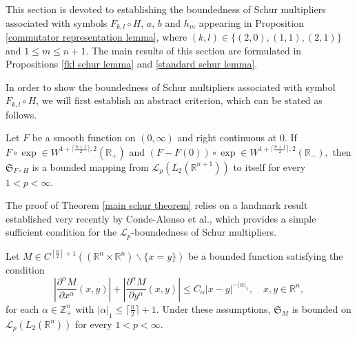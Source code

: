 \documentclass[12pt]{amsart}
\begin{document}
This section is devoted to establishing the boundedness of Schur multipliers associated with symbols $F_{k,l}\circ H$, $a$, $b$ and $h_m$ appearing in Proposition \ref{commutator representation lemma},  where $(k,l)\in\{(2,0),(1,1),(2,1)\}$ and $1\leq m\leq n+1$. The main results of this section are formulated in Propositions \ref{fkl schur lemma} and \ref{standard schur lemma}.


In order to show the boundedness of Schur multipliers associated with symbol $F_{k,l}\circ H$, we will first establish an abstract criterion, which can be stated as follows.
\begin{theorem}\label{main schur theorem} Let $F$ be a smooth function on $(0,\infty)$ and right continuous at $0.$ If $F\circ\exp\in W^{1+\lceil\frac{n+1}{2}\rceil,2}(\mathbb{R}_+)$ and $(F-F(0))\circ\exp\in W^{1+\lceil\frac{n+1}{2}\rceil,2}(\mathbb{R}_-),$ then $\mathfrak{S}_{F\circ H}$ is a bounded mapping from $\mathcal{L}_p(L_2(\mathbb{R}^{n+1}))$ to itself for every $1<p<\infty.$
\end{theorem}

The proof of Theorem \ref{main schur theorem} relies on a landmark result established very recently by Conde-Alonso {\color{blue}et al.,} which provides a simple sufficient condition for the $\mathcal{L}_p$-boundedness of Schur multipliers.
\begin{theorem}\cite[Theorem A]{MR4660138}\label{Annalspaper}
Let $M\in C^{[\frac{n}{2}]+1}((\mathbb{R}^n\times\mathbb{R}^n)\backslash\{x=y\})$ be a bounded function satisfying the condition
$$\left|\frac{\partial^\alpha M}{\partial x^\alpha}(x,y)\right|+\left|\frac{\partial^\alpha M}{\partial y^\alpha}(x,y)\right|\leq C_\alpha |x-y|^{-|\alpha|_1},\quad x,y\in\mathbb{R}^n,$$
for each $\alpha\in\mathbb{Z}_+^n$ with $|\alpha|_1\leq \lceil\frac{n}{2}\rceil+1.$ Under these assumptions, $\mathfrak{S}_M$ is bounded on $\mathcal{L}_p(L_2(\mathbb{R}^n))$ for every $1<p<\infty.$
\end{theorem}
\end{document}
